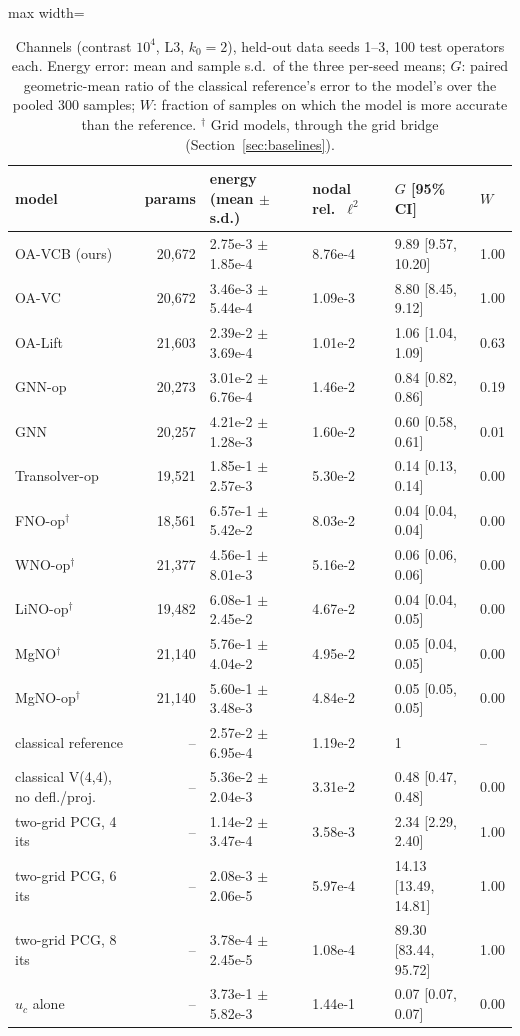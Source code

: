 \begin{table}[tbp]\centering\footnotesize\setlength{\tabcolsep}{4pt}
\caption{Channels (contrast $10^4$, L3, $k_0=2$), held-out data seeds 1--3, 100 test operators each. Energy error: mean and sample s.d.\ of the three per-seed means; $G$: paired geometric-mean ratio of the classical reference's error to the model's over the pooled 300 samples; $W$: fraction of samples on which the model is more accurate than the reference. $^\dagger$ Grid models, through the grid bridge (Section~\ref{sec:baselines}).}\label{tab:channels}
\begin{adjustbox}{max width=\linewidth}
\begin{tabular}{lrllll}\toprule
model & params & energy (mean $\pm$ s.d.) & nodal rel.\ $\ell^2$ & $G$ [95\% CI] & $W$ \\\midrule
OA-VCB (ours) & 20{,}672 & 2.75e-3 $\pm$ 1.85e-4 & 8.76e-4 & 9.89 [9.57, 10.20] & 1.00 \\
OA-VC & 20{,}672 & 3.46e-3 $\pm$ 5.44e-4 & 1.09e-3 & 8.80 [8.45, 9.12] & 1.00 \\
OA-Lift & 21{,}603 & 2.39e-2 $\pm$ 3.69e-4 & 1.01e-2 & 1.06 [1.04, 1.09] & 0.63 \\
GNN-op & 20{,}273 & 3.01e-2 $\pm$ 6.76e-4 & 1.46e-2 & 0.84 [0.82, 0.86] & 0.19 \\
GNN & 20{,}257 & 4.21e-2 $\pm$ 1.28e-3 & 1.60e-2 & 0.60 [0.58, 0.61] & 0.01 \\
Transolver-op & 19{,}521 & 1.85e-1 $\pm$ 2.57e-3 & 5.30e-2 & 0.14 [0.13, 0.14] & 0.00 \\
FNO-op$^\dagger$ & 18{,}561 & 6.57e-1 $\pm$ 5.42e-2 & 8.03e-2 & 0.04 [0.04, 0.04] & 0.00 \\
WNO-op$^\dagger$ & 21{,}377 & 4.56e-1 $\pm$ 8.01e-3 & 5.16e-2 & 0.06 [0.06, 0.06] & 0.00 \\
LiNO-op$^\dagger$ & 19{,}482 & 6.08e-1 $\pm$ 2.45e-2 & 4.67e-2 & 0.04 [0.04, 0.05] & 0.00 \\
MgNO$^\dagger$ & 21{,}140 & 5.76e-1 $\pm$ 4.04e-2 & 4.95e-2 & 0.05 [0.04, 0.05] & 0.00 \\
MgNO-op$^\dagger$ & 21{,}140 & 5.60e-1 $\pm$ 3.48e-3 & 4.84e-2 & 0.05 [0.05, 0.05] & 0.00 \\
\midrule
classical reference & -- & 2.57e-2 $\pm$ 6.95e-4 & 1.19e-2 & 1 & -- \\
classical V(4,4), no defl./proj. & -- & 5.36e-2 $\pm$ 2.04e-3 & 3.31e-2 & 0.48 [0.47, 0.48] & 0.00 \\
two-grid PCG, 4 its & -- & 1.14e-2 $\pm$ 3.47e-4 & 3.58e-3 & 2.34 [2.29, 2.40] & 1.00 \\
two-grid PCG, 6 its & -- & 2.08e-3 $\pm$ 2.06e-5 & 5.97e-4 & 14.13 [13.49, 14.81] & 1.00 \\
two-grid PCG, 8 its & -- & 3.78e-4 $\pm$ 2.45e-5 & 1.08e-4 & 89.30 [83.44, 95.72] & 1.00 \\
$u_c$ alone & -- & 3.73e-1 $\pm$ 5.82e-3 & 1.44e-1 & 0.07 [0.07, 0.07] & 0.00 \\
\bottomrule\end{tabular}
\end{adjustbox}
\end{table}
